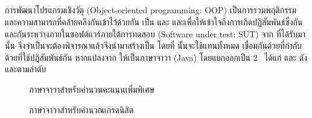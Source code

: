 {{\subsection{\FirstTimeDefine{\scg}{\scgEN}}

การพัฒนาโปรแกรมเชิงวัตุ (Object-oriented programming: OOP) เป็นการรวมพฤติกรรม และความสามารถที่คล้ายคลึงกันเข้าไว้ด้วยกัน \cite{kindler2011}
เป็น\FirstTimeDefine{\class}{\classEN} \FirstTimeDefine{\method}{\methodEN} และ \FirstTimeDefine{\attribute}{\attributeEN} 
และเพื่อให้เข้าใจถึงการเกิดปฏิสัมพันธ์ซึ่งกันและกันระหว่าง{\class}ภายในซอฟต์แวร์ภายใต้การทดสอบ (Software under test: SUT) จาก{\sourcecode} 
ที่ได้รับมานั้น จึงจำเป็นจะต้องพิจารณา{\sourcecode}แล้วจึงนำมาสร้างเป็น \FirstTimeDefine{\scg}{\scgEN} โดยที่{\scg} 
นั้นจะใช้{\Node}แทน{\class}ทั้งหมด เชื่อมกันด้วย{\Edge}ที่กำกับด้วย{\method}ที่{\class}ใช้ปฏิสัมพันธ์กัน หากแปลง{\sourcecode}จาก
 ให้เป็น{\sourcecode}ภาษาจาวา (Java) โดยแยกออกเป็น 2 \class\ ได้แก่  
และ  ดัง  และตามลำดับ

\begin{figure}[ht!]
    \lstset{style=thesiscodestyle}
    
    \caption{{\sourcecode}ภาษาจาวาสำหรับคำนวนคะแนนเพิ่มพิเศษ}
    \label{fig:javaBonusScore}
\end{figure}

\begin{figure}[ht!]
    \lstset{style=thesiscodestyle}
    
    \caption{{\sourcecode}ภาษาจาวาสำหรับคำนวณเกรดนิสิต}
    \label{fig:javaGrading}
\end{figure}

}}
